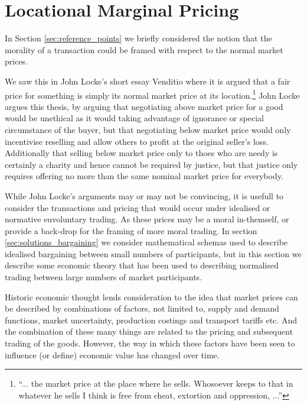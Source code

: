 \section{Locational Marginal Pricing}

In Section \ref{sec:reference_points} we briefly considered the notion that %
the morality of a transaction could be framed with respect to the normal market prices.

We saw this in John Locke's short essay Venditio \cite{locke2003locke} where it is argued that a fair price for something is simply its normal market price at its location.\footnote{``... the market price at the place where he sells. Whosoever keeps to that in whatever he sells I think is free from cheat, extortion and oppression, ...''}
John Locke argues this thesis, by arguing that negotiating above market price for a good would be unethical as it would taking advantage of ignorance or special circumstance of the buyer, but that negotiating below market price would only incentivise reselling and allow others to profit at the original seller's loss.
Additionally that selling below market price only to thoes who are needy is certainly a charity and hence cannot be required by justice, but that justice only requires offering no more than the same nominal market price for everybody.

While John Locke's arguments may or may not be convincing, it is usefull to consider the transactions and pricing that would occur under idealised or normative euvoluntary trading.
As these prices may be a moral in-themself, or provide a back-drop for the framing of more moral trading.
In section \ref{sec:solutions_bargaining} we consider mathematical schemas used to describe idealised bargaining between small numbers of participants, but in this section we describe some economic theory that has been used to describing normalised trading between large numbers of market participants.

Historic economic thought lends consideration to the idea that market prices can be described by combinations of factors, not limited to, supply and demand functions, market uncertainty, production costings and transport tariffs etc.
And the combination of these many things are related to the pricing and subsequent trading of the goods.
However, the way in which these factors have been seen to influence (or define) economic value has changed over time.

